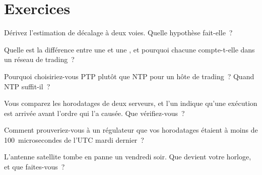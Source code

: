 \section{Exercices}

\begin{interviewq}\label{iq:nw:time-synchronisation:1}
Dérivez l'estimation de décalage à deux voies. Quelle hypothèse fait-elle~?
\end{interviewq}

\begin{interviewq}\label{iq:nw:time-synchronisation:2}
Quelle est la différence entre une  et une , et pourquoi chacune compte-t-elle dans un réseau de trading~?
\end{interviewq}

\begin{interviewq}\label{iq:nw:time-synchronisation:3}
Pourquoi choisiriez-vous PTP plutôt que NTP pour un hôte de trading~? Quand NTP suffit-il~?
\end{interviewq}

\begin{interviewq}\label{iq:nw:time-synchronisation:4}
Vous comparez les horodatages de deux serveurs, et l'un indique qu'une exécution est arrivée avant l'ordre qui l'a causée. Que vérifiez-vous~?
\end{interviewq}

\begin{interviewq}\label{iq:nw:time-synchronisation:5}
Comment prouveriez-vous à un régulateur que vos horodatages étaient à moins de 100~microsecondes de l'UTC mardi dernier~?
\end{interviewq}

\begin{interviewq}\label{iq:nw:time-synchronisation:6}
L'antenne satellite tombe en panne un vendredi soir. Que devient votre horloge, et que faites-vous~?
\end{interviewq}
